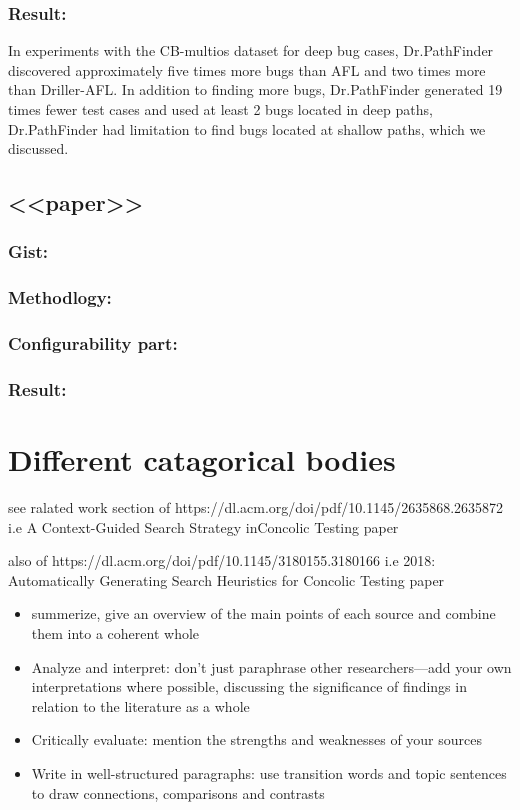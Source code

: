 \documentclass[	runningheads,
				a4paper]{llncs}
\begin{document}
\subsubsection{Result:}
In experiments with the CB-multios dataset for deep bug cases, Dr.PathFinder discovered approximately five
times more bugs than AFL and two times more than Driller-AFL. In addition to finding more bugs, Dr.PathFinder
generated 19 times fewer test cases and used at least 2%
bugs located in deep paths, Dr.PathFinder had limitation to find bugs located at shallow paths, which we discussed.

\subsection{<<paper>>}
\subsubsection{Gist:}

\subsubsection{Methodlogy:}

\subsubsection{Configurability part:}

\subsubsection{Result:}



\section{Different catagorical bodies}
see ralated work section of https://dl.acm.org/doi/pdf/10.1145/2635868.2635872
i.e A Context-Guided Search Strategy inConcolic Testing paper

also of https://dl.acm.org/doi/pdf/10.1145/3180155.3180166
i.e 2018: Automatically Generating Search Heuristics for Concolic Testing paper

\begin{itemize}
	\item summerize, give an overview of the main points of each source and combine them into a coherent whole
	\item Analyze and interpret: don’t just paraphrase other researchers—add your own interpretations where possible, discussing the significance of findings in relation to the literature as a whole
	\item Critically evaluate: mention the strengths and weaknesses of your sources
	\item Write in well-structured paragraphs: use transition words and topic sentences to draw connections, comparisons and contrasts
\end{itemize}
\end{document}
